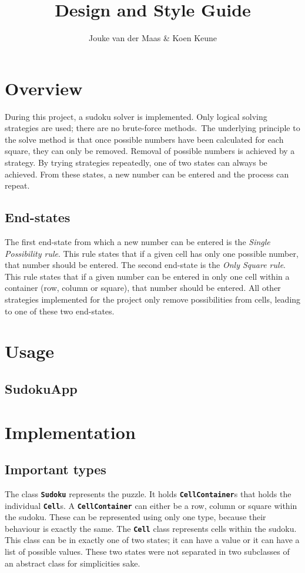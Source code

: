 \documentclass[11pt, a4paper, fleqn]{article}
\title{Design and Style Guide}
\author{Jouke van der Maas \& Koen Keune}
\newcommand{\class}[1]{{\color{class}\textbf{\lstinline{#1}}}}
\begin{document}
\maketitle

\section{Overview}
During this project, a sudoku solver is implemented. Only
logical solving strategies are used; there are no brute-force methods.\
The underlying principle to the solve method is that once
possible numbers have been calculated for each square, they can only be removed.
Removal of possible numbers is achieved by a strategy.
By trying strategies repeatedly, one of two states can always be achieved. From these
states, a new number can be entered and the process can repeat.

\subsection{End-states}
The first end-state from which a new number can be entered is the 
\emph{Single Possibility rule}. This rule states that if a given cell has only one
possible number, that number should be entered. The second end-state is the \emph{%
Only Square rule}. This rule states that if a given number can be entered in only one
cell within a container (row, column or square), that number should be entered. All
other strategies implemented for the project only remove possibilities from cells, leading
to one of these two end-states.

\section{Usage}
\subsection{SudokuApp}

\section{Implementation}
\subsection{Important types}
The class \class{Sudoku} represents the puzzle. It holds \class{CellContainer}s that holds
the individual \class{Cell}s. A \class{CellContainer} can either be a row, column or square
within the sudoku. These can be represented using only one type, because their behaviour is
exactly the same. The \class{Cell} class represents cells within the sudoku. This class can
be in exactly one of two states; it can have a value or it can have a list of possible values.
These two states were not separated in two subclasses of an abstract class for simplicities sake.
\end{document}
